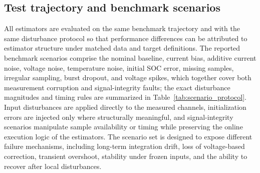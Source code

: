 \documentclass[review]{elsarticle}
\begin{document}
\subsection{Test trajectory and benchmark scenarios}
All estimators are evaluated on the same benchmark trajectory and with the same disturbance protocol so that performance differences can be attributed to estimator structure under matched data and target definitions. The reported benchmark scenarios comprise the nominal baseline, current bias, additive current noise, voltage noise, temperature noise, initial SOC error, missing samples, irregular sampling, burst dropout, and voltage spikes, which together cover both measurement corruption and signal-integrity faults; the exact disturbance magnitudes and timing rules are summarized in Table~\ref{tab:scenario_protocol}. Input disturbances are applied directly to the measured channels, initialization errors are injected only where structurally meaningful, and signal-integrity scenarios manipulate sample availability or timing while preserving the online execution logic of the estimators. The scenario set is designed to expose different failure mechanisms, including long-term integration drift, loss of voltage-based correction, transient overshoot, stability under frozen inputs, and the ability to recover after local disturbances.
\end{document}
